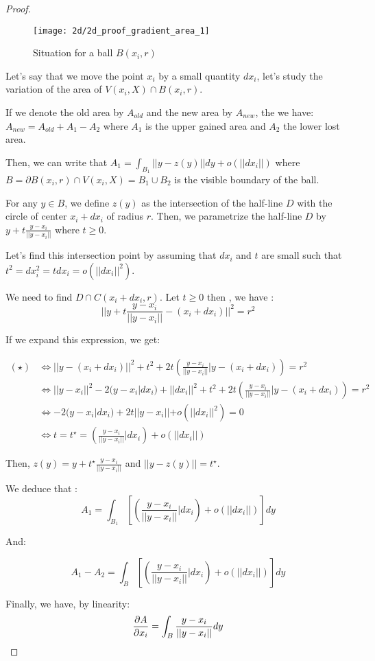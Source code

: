 \begin{proof}

\begin{figure}[H]
    \centering
    \texttt{[image: 2d/2d\_proof\_gradient\_area\_1]}
    \caption{Situation for a ball $ B(x_i, r) $}
\end{figure}

Let's say that we move the point $ x _i $ by a small quantity $ dx_i $, let's study the variation
of the area of $ V(x_i, X) \cap B(x_i, r) $.

If we denote the old area by $ A_{old} $ and the new area by $ A_{new} $, the we
have: $ A_{new} = A_{old} + A_1 - A_2 $ where $ A_1 $ is the upper gained area
and $ A_2 $ the lower lost area.

Then, we can write that $ A_1 = \int_{B_1} || y - z(y) || dy + o(||dx_i||) $ where $ B =
\partial B(x_i, r) \cap V(x_i, X) = B_1 \cup B_2 $ is the visible boundary of
the ball.

For any $ y \in B $, we define $ z(y) $ as the intersection of the half-line $ D $
with the circle of center $ x_i + dx_i $ of radius $ r $.
Then, we parametrize the half-line $ D $ by $ y + t \frac{y - x_i}{||y - x_i||}
$ where $ t \ge 0 $.

Let's find this intersection point by assuming that $ dx_i $ and $ t $ are small
such that $ t^2 = dx_i^2 = t dx_i = o(||dx_i||^2) $.

We need to find $ D \cap C(x_i + dx_i, r) $. Let $ t \ge 0 $ then , we have :
\begin{equation}
    || y + t \frac{y - x_i}{|| y - x_i||} - (x_i + dx_i) ||^2 = r^2
    \tag{$\star$}
\end{equation}

If we expand this expression, we get:

\begin{align*}
    (\star) & \iff || y
    - (x_i + dx_i) ||^2 + t^2 + 2t \left( \frac{y-x_i}{|| y - x_i||} | y - (x_i
        + dx_i) \right) = r^2 \\
    & \iff || y - x_i || ^2 - 2 (y - x_i | dx_i) + || dx_i || ^2 + t^2 + 2t
    \left( \frac{y-x_i}{|| y - x_i||} | y - (x_i + dx_i) \right) = r^2 \\
    & \iff -2 (y - x_i | dx_i) + 2t || y - x_i|| + o(||dx_i||^2) = 0 \\
    & \iff t = t^{\star} = \left( \frac{y - x_i}{||y - x_i||} | dx_i \right) +
    o(||dx_i||)
\end{align*}

Then, $ z(y) = y + t^{\star} \frac{y - x_i}{||y - x_i||} $ and $ || y - z(y) || =
t^{\star} $.

We deduce that :
$$ A_1 = \int_{B_1} \left[ \left( \frac{y - x_i}{||y - x_i||} | dx_i \right) +
o(||dx_i||) \right] dy $$

And:

$$ A_1 - A_2 = \int_{B} \left[ \left( \frac{y - x_i}{||y - x_i||} | dx_i \right)
+ o(||dx_i||) \right] dy $$

Finally, we have, by linearity:
$$ \frac{\partial{A}}{\partial{x_i}} = \int_{B} \frac{y - x_i}{||y - x_i||} dy $$

\end{proof}

